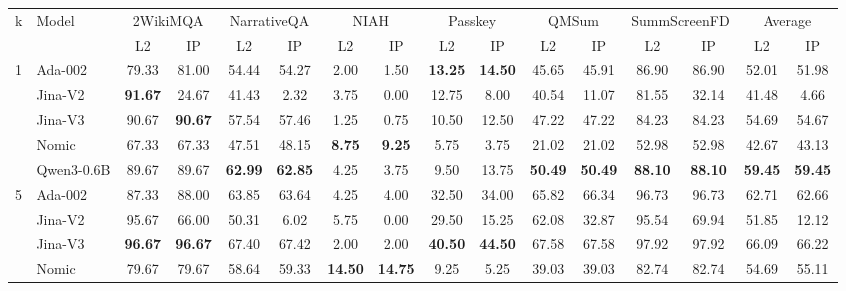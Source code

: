 \begin{sidewaystable}[htbp!]
\centering
\footnotesize
{}
\label{tab:detailed_recall}
\begin{tabular}{llcccccccccccccc}
\toprule
\multirow{2}{*}{k} & \multirow{2}{*}{Model} & \multicolumn{2}{c}{2WikiMQA} & \multicolumn{2}{c}{NarrativeQA} & \multicolumn{2}{c}{NIAH} & \multicolumn{2}{c}{Passkey} & \multicolumn{2}{c}{QMSum} & \multicolumn{2}{c}{SummScreenFD} & \multicolumn{2}{c}{Average} \\
\cmidrule(lr){3-4} \cmidrule(lr){5-6} \cmidrule(lr){7-8} \cmidrule(lr){9-10} \cmidrule(lr){11-12} \cmidrule(lr){13-14} \cmidrule(lr){15-16}
& & L2 & IP & L2 & IP & L2 & IP & L2 & IP & L2 & IP & L2 & IP & L2 & IP \\
\midrule
\multirow{5}{*}{1} & Ada-002 & 79.33 & 81.00 & 54.44 & 54.27 & 2.00 & 1.50 & \textbf{13.25} & \textbf{14.50} & 45.65 & 45.91 & 86.90 & 86.90 & 52.01 & 51.98 \\
& Jina-V2 & \textbf{91.67} & 24.67 & 41.43 & 2.32 & 3.75 & 0.00 & 12.75 & 8.00 & 40.54 & 11.07 & 81.55 & 32.14 & 41.48 & 4.66 \\
& Jina-V3 & 90.67 & \textbf{90.67} & 57.54 & 57.46 & 1.25 & 0.75 & 10.50 & 12.50 & 47.22 & 47.22 & 84.23 & 84.23 & 54.69 & 54.67 \\
& Nomic & 67.33 & 67.33 & 47.51 & 48.15 & \textbf{8.75} & \textbf{9.25} & 5.75 & 3.75 & 21.02 & 21.02 & 52.98 & 52.98 & 42.67 & 43.13 \\
& Qwen3-0.6B & 89.67 & 89.67 & \textbf{62.99} & \textbf{62.85} & 4.25 & 3.75 & 9.50 & 13.75 & \textbf{50.49} & \textbf{50.49} & \textbf{88.10} & \textbf{88.10} & \textbf{59.45} & \textbf{59.45} \\
\midrule
\multirow{5}{*}{5} & Ada-002 & 87.33 & 88.00 & 63.85 & 63.64 & 4.25 & 4.00 & 32.50 & 34.00 & 65.82 & 66.34 & 96.73 & 96.73 & 62.71 & 62.66 \\
& Jina-V2 & 95.67 & 66.00 & 50.31 & 6.02 & 5.75 & 0.00 & 29.50 & 15.25 & 62.08 & 32.87 & 95.54 & 69.94 & 51.85 & 12.12 \\
& Jina-V3 & \textbf{96.67} & \textbf{96.67} & 67.40 & 67.42 & 2.00 & 2.00 & \textbf{40.50} & \textbf{44.50} & 67.58 & 67.58 & 97.92 & 97.92 & 66.09 & 66.22 \\
& Nomic & 79.67 & 79.67 & 58.64 & 59.33 & \textbf{14.50} & \textbf{14.75} & 9.25 & 5.25 & 39.03 & 39.03 & 82.74 & 82.74 & 54.69 & 55.11 \\

\end{tabular}
\end{sidewaystable}
